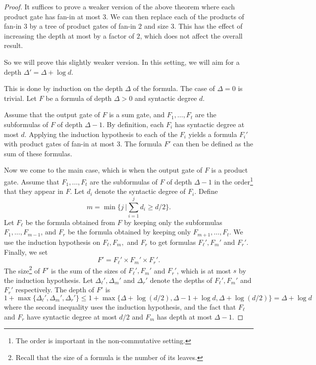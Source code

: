 \documentclass[11pt,a4paper]{article}
\begin{document}
\begin{proof}
	It suffices to prove a weaker version of the above theorem where each product gate has fan-in at most $3$. We can then replace each of the products of fan-in $3$ by a tree of product gates of fan-in $2$ and size $3$. This has the effect of increasing the depth at most by a factor of $2$, which does not affect the overall result. 
	
	So we will prove this slightly weaker version. In this setting, we will aim for a depth $\Delta' = \Delta + \log d.$
	
	This is done by induction on the depth $\Delta$ of the formula. The case of $\Delta = 0$ is trivial. Let $F$ be a formula of depth $\Delta > 0$ and syntactic degree $d$.
	
	Assume that the output gate of $F$ is a sum gate, and $F_1,\ldots, F_t$ are the subformulas of $F$ of depth $\Delta -1$. By definition, each $F_i$ has syntactic degree at most $d$. Applying the induction hypothesis to each of the $F_i$ yields a formula $F_i'$ with product gates of fan-in at most $3$. The formula $F'$ can then be defined as the sum of these formulas. 
	
	Now we come to the main case, which is when the output gate of $F$ is a product gate. Assume that $F_1,\ldots, F_t$ are the subformulas of $F$ of depth $\Delta -1$ in the order\footnote{The order is important in the non-commutative setting.} that they appear in $F$. Let $d_i$ denote the syntactic degree of $F_i$. Define 
	\[
	m = \min\{j \ | \sum_{i= 1}^j d_i \geq d/2\}.
	\]
	Let $F_\ell$ be the formula obtained from $F$ by keeping only the subformulas $F_1,\ldots,F_{m-1}$, and $F_r$ be the formula obtained by keeping only $F_{m+1},\ldots,F_t.$ We use the induction hypothesis on $F_\ell, F_m,$ and $F_r$ to get formulas $F_\ell', F_m'$ and $F_r'$. Finally, we set 
	\[
	F' = F_\ell' \times F_m' \times F_r'.
	\]
	The size\footnote{Recall that the size of a formula is the number of its leaves.} of $F'$ is the sum of the sizes of $F_\ell', F_m'$ and $F_r'$, which is at most $s$ by the induction hypothesis. Let $\Delta_\ell', \Delta_m'$ and $\Delta_r'$ denote the depths of $F_\ell', F_m'$ and $F_r'$ respectively. The depth of $F'$ is 
	\[
	1+\max\{ \Delta_\ell', \Delta_m', \Delta_r'\} \leq 1+ \max\{\Delta + \log(d/2), \Delta-1 + \log d, \Delta + \log(d/2)\} = \Delta + \log d
	\]
	where the second inequality uses the induction hypothesis, and the fact that $F_{\ell}$ and $F_r$ have syntactic degree at most $d/2$ and $F_m$ has depth at most $\Delta-1.$
\end{proof}
\end{document}
